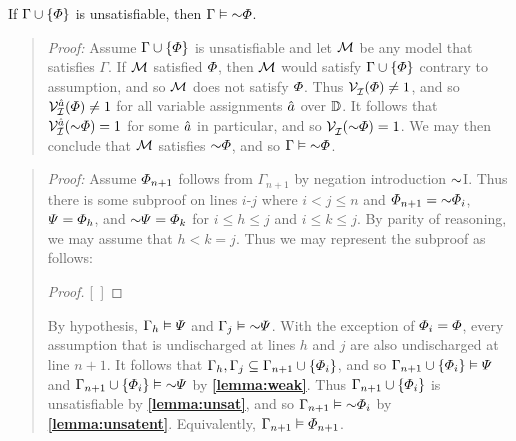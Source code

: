 \begin{Lthm} \label{lemma:unsatent}
  If $\Gamma \cup \lbrace\varPhi\rbrace$ is unsatisfiable, then $\Gamma \models \enot\metaA$.
\end{Lthm}

\begin{quote} 
  \textit{Proof:} Assume $\Gamma \cup \lbrace\varPhi\rbrace$ is unsatisfiable and let $\mathcal{M}$ be any model that satisfies $\Gamma$. 
  If $\mathcal{M}$ satisfied $\varPhi$, then $\mathcal{M}$ would satisfy $\Gamma \cup \lbrace\varPhi\rbrace$ contrary to assumption, and so $\mathcal{M}$ does not satisfy $\varPhi$.
  Thus $\mathcal{V}_{\mathcal{I}}^{}(\varPhi)\neq 1$, and so $\mathcal{V}_{\mathcal{I}}^{\hat{a}}(\varPhi)\neq 1$ for all variable assignments $\hat{a}$ over $\mathbb{D}$.
  It follows that $\VV{\I}{\va{a}}(\enot\metaA)= 1$ for some $\hat{a}$ in particular, and so $\VV{\I}{}(\enot\metaA)= 1$.
  We may then conclude that $\mathcal{M}$ satisfies $\enot\metaA$, and so $\Gamma \models \enot\metaA$.
\end{quote}




\label{rule:NegI}

\begin{quote} 
  \textit{Proof:} Assume $\varPhi_{n+1}$ follows from $\Gamma_{n+1}$ by negation introduction $\enot$I.
  Thus there is some subproof on lines $i$-$j$ where $i<j\leq n$ and $\metaA_{n+1}=\enot\metaA_i$, $\varPsi=\varPhi_h$, and $\enot\metaB=\metaA_k$ for $i\leq h\leq j$ and $i\leq k\leq j$.
  By parity of reasoning, we may assume that $h<k=j$.
  Thus we may represent the subproof as follows:

  \begin{proof}
  \open
    \metaA {}
    \metaB
  \close
  [\ ]{\enot\metaA} %
  \end{proof}

  By hypothesis, $\Gamma_h \vDash \varPsi$ and $\Gamma_j \models \enot\metaB$.
  With the exception of $\varPhi_i=\varPhi$, every assumption that is undischarged at lines $h$ and $j$ are also undischarged at line $n+1$.
  It follows that $\Gamma_h,\Gamma_j\subseteq\Gamma_{n+1}\cup\lbrace\varPhi_i\rbrace$, and so $\Gamma_{n+1}\cup\lbrace\varPhi_i\rbrace \vDash \varPsi$ and $\Gamma_{n+1}\cup\set{\metaA_i} \models \enot\metaB$ by \textbf{\ref{lemma:weak}}.
  Thus $\Gamma_{n+1}\cup\lbrace\varPhi_i\rbrace$ is unsatisfiable by \textbf{\ref{lemma:unsat}}, and so $\Gamma_{n+1} \models \enot\metaA_i$ by \textbf{\ref{lemma:unsatent}}.
  Equivalently, $\Gamma_{n+1} \vDash \varPhi_{n+1}$.
\end{quote}





